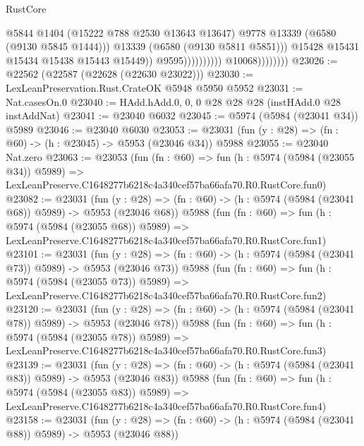 \begin{lexlean}{RustCore}
\begin{coremodule}
                                                @5844
                                                @1404
                                                (@15222 @788 @2530 @13643 @13647)
                                                @9778
                                                @13339
                                                (@6580 (@9130 @5845 @1444)))
                                              @13339
                                              (@6580 (@9130 @5811 @5851)))
                                            @15428
                                            @15431
                                            @15434
                                            @15438
                                            @15443
                                            @15449))
                                        @9595))))))))))
                    @10068))))))))
@23026 := @22562 (@22587 (@22628 (@22630 @23022)))
@23030 := LexLeanPreservation.Rust.CrateOK @5948 @5950 @5952
@23031 := Nat.casesOn.{0}
@23040 := HAdd.hAdd.{0, 0, 0} @28 @28 @28 (instHAdd.{0} @28 instAddNat)
@23041 := @23040 @6032
@23045 := @5974 (@5984 (@23041 @34)) @5989
@23046 := @23040 @6030
@23053 := @23031 (fun (y : @28) => (fn : @60) -> (h : @23045) -> @5953 (@23046 @34)) @5988
@23055 := @23040 Nat.zero
@23063 := @23053
    (fun (fn : @60) =>
    fun (h : @5974 (@5984 (@23055 @34)) @5989) =>
    LexLeanPreserve.C1648277b6218c4a340cef57ba66afa70.R0.RustCore.fun0)
@23082 := @23031
    (fun (y : @28) => (fn : @60) -> (h : @5974 (@5984 (@23041 @68)) @5989) -> @5953 (@23046 @68))
    @5988
    (fun (fn : @60) =>
    fun (h : @5974 (@5984 (@23055 @68)) @5989) =>
    LexLeanPreserve.C1648277b6218c4a340cef57ba66afa70.R0.RustCore.fun1)
@23101 := @23031
    (fun (y : @28) => (fn : @60) -> (h : @5974 (@5984 (@23041 @73)) @5989) -> @5953 (@23046 @73))
    @5988
    (fun (fn : @60) =>
    fun (h : @5974 (@5984 (@23055 @73)) @5989) =>
    LexLeanPreserve.C1648277b6218c4a340cef57ba66afa70.R0.RustCore.fun2)
@23120 := @23031
    (fun (y : @28) => (fn : @60) -> (h : @5974 (@5984 (@23041 @78)) @5989) -> @5953 (@23046 @78))
    @5988
    (fun (fn : @60) =>
    fun (h : @5974 (@5984 (@23055 @78)) @5989) =>
    LexLeanPreserve.C1648277b6218c4a340cef57ba66afa70.R0.RustCore.fun3)
@23139 := @23031
    (fun (y : @28) => (fn : @60) -> (h : @5974 (@5984 (@23041 @83)) @5989) -> @5953 (@23046 @83))
    @5988
    (fun (fn : @60) =>
    fun (h : @5974 (@5984 (@23055 @83)) @5989) =>
    LexLeanPreserve.C1648277b6218c4a340cef57ba66afa70.R0.RustCore.fun4)
@23158 := @23031
    (fun (y : @28) => (fn : @60) -> (h : @5974 (@5984 (@23041 @88)) @5989) -> @5953 (@23046 @88))

\end{coremodule}
\end{lexlean}
